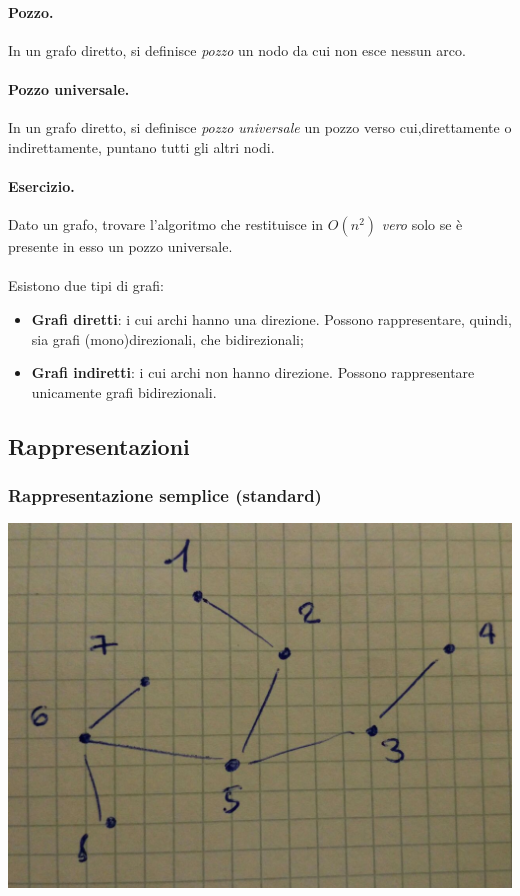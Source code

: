 \paragraph{Pozzo.}
In un grafo diretto, si definisce \textit{pozzo} un nodo da cui non esce nessun arco.
\paragraph{Pozzo universale.}
In un grafo diretto, si definisce \textit{pozzo universale} un pozzo verso cui,direttamente o indirettamente, puntano tutti gli altri nodi.
\paragraph{Esercizio.}
Dato un grafo, trovare l'algoritmo che restituisce in $ O(n^2) $ \textit{vero} solo se è presente in esso un pozzo universale. \\\\
Esistono due tipi di grafi:
\begin{itemize}
    \item \textbf{Grafi diretti}: i cui archi hanno una direzione. Possono rappresentare, quindi, sia grafi (mono)direzionali, che bidirezionali;
    \item \textbf{Grafi indiretti}: i cui archi non hanno direzione. Possono rappresentare unicamente grafi bidirezionali.
\end{itemize}

\newpage

\subsection{Rappresentazioni}
\subsubsection{Rappresentazione semplice (standard)}
\begin{center}
    \includegraphics[width=.4\textwidth]{rappresentazione-standard.jpg} \hfill
\end{center}
